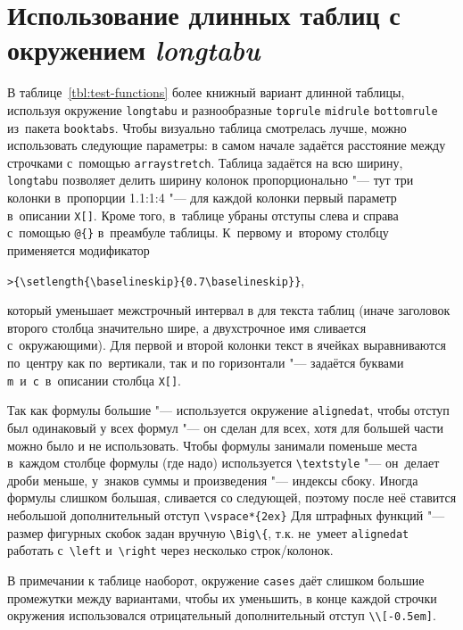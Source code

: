 \section{Использование длинных таблиц с окружением \textit{longtabu}}
\label{AppendixB2a}

В таблице~\ref{tbl:test-functions} более книжный вариант 
длинной таблицы, используя окружение \verb!longtabu! и разнообразные
\verb!toprule! \verb!midrule! \verb!bottomrule! из~пакета
\verb!booktabs!. Чтобы визуально таблица смотрелась лучше, можно
использовать следующие параметры: в самом начале задаётся расстояние
между строчками с~помощью \verb!arraystretch!. Таблица задаётся на
всю ширину, \verb!longtabu! позволяет делить ширину колонок
пропорционально "--- тут три колонки в~пропорции 1.1:1:4 "--- для каждой
колонки первый параметр в~описании \verb!X[]!. Кроме того, в~таблице
убраны отступы слева и справа с~помощью \verb!@{}!
в~преамбуле таблицы. К~первому и~второму столбцу применяется
модификатор

\verb!>{\setlength{\baselineskip}{0.7\baselineskip}}!,

\noindent который уменьшает межстрочный интервал в для текста таблиц (иначе
заголовок второго столбца значительно шире, а двухстрочное имя
сливается с~окружающими). Для первой и второй колонки текст в ячейках
выравниваются по~центру как по~вертикали, так и по горизонтали "---
задаётся буквами \verb!m!~и~\verb!c!~в~описании столбца \verb!X[]!.

Так как формулы большие "--- используется окружение \verb!alignedat!,
чтобы отступ был одинаковый у всех формул "--- он сделан для всех, хотя
для большей части можно было и не использовать.  Чтобы формулы
занимали поменьше места в~каждом столбце формулы (где надо)
используется \verb!\textstyle! "--- он~делает дроби меньше, у~знаков
суммы и произведения "--- индексы сбоку. Иногда формулы слишком большая,
сливается со следующей, поэтому после неё ставится небольшой
дополнительный отступ \verb!\vspace*{2ex}!  Для штрафных функций "---
размер фигурных скобок задан вручную \verb!\Big\{!, т.\:к. не~умеет
\verb!alignedat! работать с~\verb!\left! и~\verb!\right! через
несколько строк/колонок.

В примечании к таблице наоборот, окружение \verb!cases! даёт слишком
большие промежутки между вариантами, чтобы их уменьшить, в конце
каждой строчки окружения использовался отрицательный дополнительный
отступ \verb!\\[-0.5em]!.

